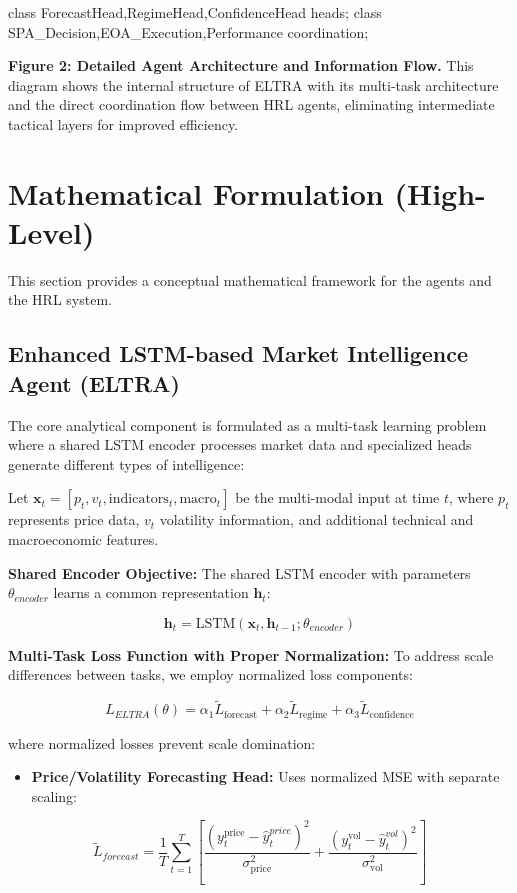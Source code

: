 \documentclass[11pt,a4paper]{article}
\begin{document}
    class ForecastHead,RegimeHead,ConfidenceHead heads;
    class SPA\_Decision,EOA\_Execution,Performance coordination;

\textbf{Figure 2: Detailed Agent Architecture and Information Flow.} This diagram shows the internal structure of ELTRA with its multi-task architecture and the direct coordination flow between HRL agents, eliminating intermediate tactical layers for improved efficiency.

\section{Mathematical Formulation (High-Level)}

This section provides a conceptual mathematical framework for the agents and the HRL system.

\subsection{Enhanced LSTM-based Market Intelligence Agent (ELTRA)}

The core analytical component is formulated as a multi-task learning problem where a shared LSTM encoder processes market data and specialized heads generate different types of intelligence:

Let $\mathbf{x}_t = [p_t, v_t, \text{indicators}_t, \text{macro}_t]$ be the multi-modal input at time $t$, where $p_t$ represents price data, $v_t$ volatility information, and additional technical and macroeconomic features.

\textbf{Shared Encoder Objective:}
The shared LSTM encoder with parameters $\theta_{encoder}$ learns a common representation $\mathbf{h}_t$:

\begin{equation}
\mathbf{h}_t = \text{LSTM}(\mathbf{x}_t, \mathbf{h}_{t-1}; \theta_{encoder})
\end{equation}

\textbf{Multi-Task Loss Function with Proper Normalization:}
To address scale differences between tasks, we employ normalized loss components:

\begin{equation}
L_{ELTRA}(\theta) = \alpha_1 \tilde{L}_{\text{forecast}} + \alpha_2 \tilde{L}_{\text{regime}} + \alpha_3 \tilde{L}_{\text{confidence}}
\end{equation}

where normalized losses prevent scale domination:

\begin{itemize}
\item   \textbf{Price/Volatility Forecasting Head:} Uses normalized MSE with separate scaling:
\end{itemize}
    \begin{equation}
    \tilde{L}_{forecast} = \frac{1}{T} \sum_{t=1}^{T} \left[\frac{(y_t^{\text{price}} - \hat{y}_t^{price})^2}{\sigma_{\text{price}}^2} + \frac{(y_t^{\text{vol}} - \hat{y}_t^{vol})^2}{\sigma_{\text{vol}}^2}\right]
\end{equation}
\end{document}
